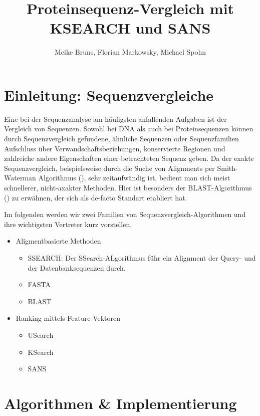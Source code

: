 \documentclass{article}
\title{Proteinsequenz-Vergleich mit KSEARCH und SANS}
\author{Meike Bruns, Florian Markowsky, Michael Spohn}
\begin{document}
\maketitle
\thispagestyle{empty}
\begin{abstract}
\end{abstract}
\newpage

\tableofcontents
\thispagestyle{empty}
\newpage

\section{Einleitung: Sequenzvergleiche}

Eine bei der Sequenzanalyse am häufigsten anfallenden Aufgaben ist der Vergleich von Sequenzen. Sowohl bei DNA als auch bei Proteinsequenzen können
durch Sequenzvergleich gefundene, ähnliche Sequenzen oder Sequenzfamilien Aufschluss über Verwandschaftsbeziehungen, konservierte Regionen und zahlreiche
andere Eigenschaften einer betrachteten Sequenz geben. Da der exakte Sequenzvergleich, beispielsweise durch die Suche von Alignments per Smith-Waterman
Algorithmus (\cite{Water}), sehr zeitaufwändig ist, bedient man sich meist schnellerer, nicht-axakter Methoden. Hier ist besonders der BLAST-Algorithmus (\cite{BLAST})
zu erwähnen, der sich als de-facto Standart etabliert hat.

Im folgenden werden wir zwei Familien von Sequenzvergleich-Algorithmen und ihre wichtigsten Vertreter kurz vorstellen.
\begin{itemize}
  \item Aligmentbasierte Methoden
    \begin{itemize}
      \item SSEARCH: Der SSearch-ALgorithmus führ ein Alignment der Query- und der Datenbanksequenzen durch. %
      \item FASTA
      \item BLAST
    \end{itemize}
  \item Ranking mittels Feature-Vektoren
    \begin{itemize}
      \item USearch
      \item KSearch
      \item SANS
    \end{itemize}
\end{itemize}

\section{Algorithmen \& Implementierung}
\end{document}
